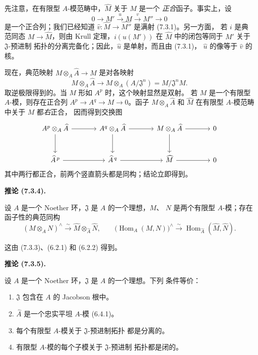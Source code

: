 \documentclass[UTF8,fontset=none,11pt,oneside,openany]{ctexbook}
\newenvironment{corollary}[1][]{%
  \par\medskip\noindent\textbf{推论 (#1).}\ %
}{\par}
\let\EGAOriginalLabel\label
\renewcommand{\label}[1]{\phantomsection\EGAOriginalLabel{#1}}
\begin{document}
先注意，在有限型 $A$-模范畴中，$\widehat M$ 关于 $M$ 是一个
\emph{正合}函子。事实上，设
\[
  0\to M'\xrightarrow{u}M\xrightarrow{v}M''\to0
\]
是一个正合列；我们已经知道
$\widehat v:\widehat M\to\widehat{M''}$ 是满射 (7.3.1)。另一方面，
若 $i$ 是典范同态 $M\to\widehat M$，则由 Krull 定理，$i(u(M'))$
在 $\widehat M$ 中的闭包等同于 $M'$ 关于 $\mathfrak J$-预进制
拓扑的分离完备化；因此，$\widehat u$ 是单射，而且由 (7.3.1)，
$\widehat u$ 的像等于 $\widehat v$ 的核。

现在，典范映射 $M\otimes_A\widehat A\to\widehat M$ 是对各映射
\[
  M\otimes_A\widehat A\to
  M\otimes_A(A/\mathfrak J^n)=M/\mathfrak J^nM.
\]
取逆极限得到的。当 $M$ 形如 $A^p$ 时，这个映射显然是双射。
若 $M$ 是一个有限型 $A$-模，则存在正合列
$A^p\to A^q\to M\to0$。函子 $M\otimes_A\widehat A$ 和
$\widehat M$ 在有限型 $A$-模范畴中关于 $M$ 都\emph{右}正合，
因而得到交换图
\[
\begin{tikzcd}[column sep=large,row sep=large]
  A^p\otimes_A\widehat A \arrow[r] \arrow[d] &
  A^q\otimes_A\widehat A \arrow[r] \arrow[d] &
  M\otimes_A\widehat A \arrow[r] \arrow[d] &
  0 \\
  \widehat A^{\,p} \arrow[r] &
  \widehat A^{\,q} \arrow[r] &
  \widehat M \arrow[r] &
  0
\end{tikzcd}
\]
其中两行都正合，前两个竖直箭头都是同构；结论立即得到。

\begin{corollary}[7.3.4]
\label{0.7.3.4-fr}
设 $A$ 是一个 Noether 环，$\mathfrak J$ 是 $A$ 的一个理想，$M$、
$N$ 是两个有限型 $A$-模；存在函子性的典范同构
\[
  (M\otimes_A N)^\wedge
  \xrightarrow{\sim}
  \widehat M\otimes_{\widehat A}\widehat N,
  \qquad
  \bigl(\operatorname{Hom}_A(M,N)\bigr)^\wedge
  \xrightarrow{\sim}
  \operatorname{Hom}_{\widehat A}(\widehat M,\widehat N).
\]
\end{corollary}

这由 (7.3.3)、(6.2.1) 和 (6.2.2) 得到。

\begin{corollary}[7.3.5]
\label{0.7.3.5-fr}
设 $A$ 是一个 Noether 环，$\mathfrak J$ 是 $A$ 的一个理想。下列
条件等价：
\begin{enumerate}
  \item[$a)$] $\mathfrak J$ 包含在 $A$ 的 Jacobson 根中。
  \item[$b)$] $\widehat A$ 是一个忠实平坦 $A$-模 (6.4.1)。
  \item[$c)$] 每个有限型 $A$-模关于 $\mathfrak J$-预进制拓扑
  都是分离的。
  \item[$d)$] 有限型 $A$-模的每个子模关于 $\mathfrak J$-预进制
  拓扑都是闭的。
\end{enumerate}
\end{corollary}
\end{document}
